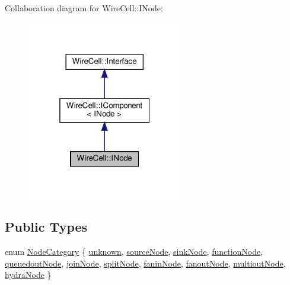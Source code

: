 Collaboration diagram for Wire\+Cell\+:\+:I\+Node\+:
\nopagebreak
\begin{figure}[H]
\begin{center}
\leavevmode
\includegraphics[width=193pt]{class_wire_cell_1_1_i_node__coll__graph}
\end{center}
\end{figure}
\subsection*{Public Types}
\begin{DoxyCompactItemize}
\item 
enum \hyperlink{class_wire_cell_1_1_i_node_a5546e64cbb70bd3ac787295cac9ac803}{Node\+Category} \{ \newline
\hyperlink{class_wire_cell_1_1_i_node_a5546e64cbb70bd3ac787295cac9ac803a91c7cb66e05262fb6b1e5a6d47fc0257}{unknown}, 
\hyperlink{class_wire_cell_1_1_i_node_a5546e64cbb70bd3ac787295cac9ac803a7cbfecaab254f7741afecce217ace559}{source\+Node}, 
\hyperlink{class_wire_cell_1_1_i_node_a5546e64cbb70bd3ac787295cac9ac803a313b54cdce0bdfc6d8390376805d3625}{sink\+Node}, 
\hyperlink{class_wire_cell_1_1_i_node_a5546e64cbb70bd3ac787295cac9ac803ab0b3b7efc808d5ea16ff51c5324cbee4}{function\+Node}, 
\newline
\hyperlink{class_wire_cell_1_1_i_node_a5546e64cbb70bd3ac787295cac9ac803a0ff8b55efa8f153aaaccd81d69220ed3}{queuedout\+Node}, 
\hyperlink{class_wire_cell_1_1_i_node_a5546e64cbb70bd3ac787295cac9ac803ab2cfcbeeaaa96a78a4a1e9b8da39b97b}{join\+Node}, 
\hyperlink{class_wire_cell_1_1_i_node_a5546e64cbb70bd3ac787295cac9ac803a16ae6c629db70d0dbdae7dabf6bcfe8e}{split\+Node}, 
\hyperlink{class_wire_cell_1_1_i_node_a5546e64cbb70bd3ac787295cac9ac803a1188391668abbbc3177224d52b3b59b0}{fanin\+Node}, 
\newline
\hyperlink{class_wire_cell_1_1_i_node_a5546e64cbb70bd3ac787295cac9ac803a190c9ff91670d306a4d24e0499da1b4c}{fanout\+Node}, 
\hyperlink{class_wire_cell_1_1_i_node_a5546e64cbb70bd3ac787295cac9ac803ad0b19460ef72739732096b579f2f03fc}{multiout\+Node}, 
\hyperlink{class_wire_cell_1_1_i_node_a5546e64cbb70bd3ac787295cac9ac803a3a4f018c9b1f2bd6f941a7bc06fd2ab3}{hydra\+Node}
 \}
\end{DoxyCompactItemize}
